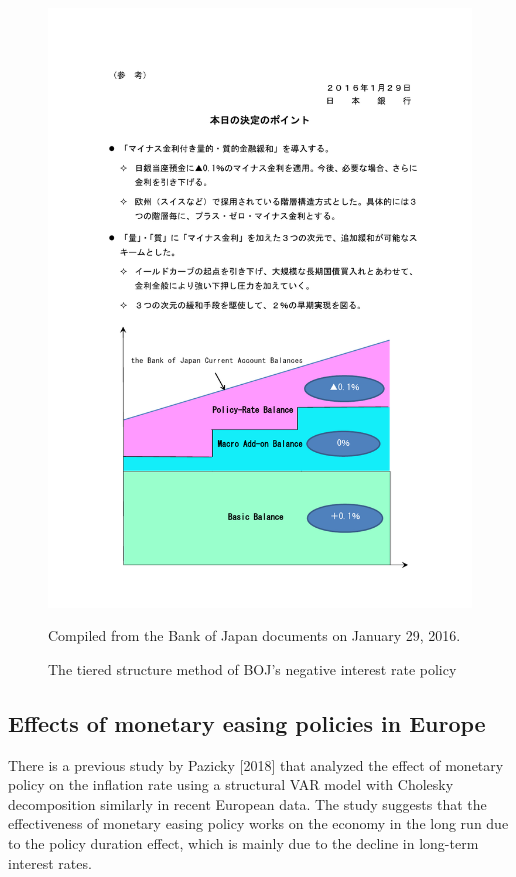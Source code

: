\documentclass[12pt]{article}
\begin{document}
\begin{figure}[H]
    \centering
    \caption{The tiered structure method of BOJ's negative interest rate policy}
    \includegraphics[width=17cm]{currentaccount.pdf}

    Compiled from the Bank of Japan documents on January 29, 2016.
\end{figure}

\newpage
\subsection{Effects of monetary easing policies in Europe}

There is a previous study by Pazicky [2018] that analyzed the effect of monetary policy on the inflation rate using a structural VAR model with Cholesky decomposition similarly in recent European data.
The study suggests that the effectiveness of monetary easing policy works on the economy in the long run due to the policy duration effect, which is mainly due to the decline in long-term interest rates.
\end{document}
